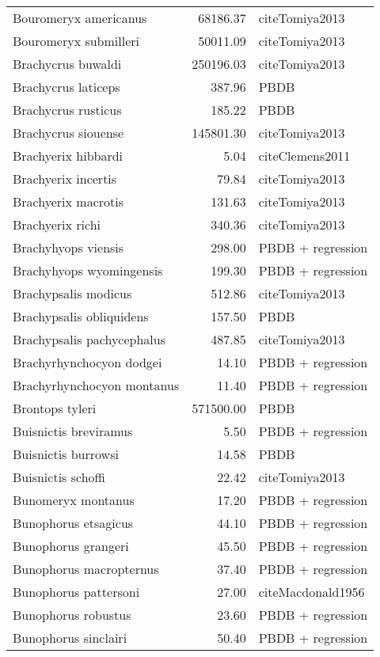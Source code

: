 \begin{table}[ht]
\begin{tabular}{lrl}
  Bouromeryx americanus & 68186.37 & cite{Tomiya2013} \\ 
  Bouromeryx submilleri & 50011.09 & cite{Tomiya2013} \\ 
  Brachycrus buwaldi & 250196.03 & cite{Tomiya2013} \\ 
  Brachycrus laticeps & 387.96 & PBDB \\ 
  Brachycrus rusticus & 185.22 & PBDB \\ 
  Brachycrus siouense & 145801.30 & cite{Tomiya2013} \\ 
  Brachyerix hibbardi & 5.04 & cite{Clemens2011} \\ 
  Brachyerix incertis & 79.84 & cite{Tomiya2013} \\ 
  Brachyerix macrotis & 131.63 & cite{Tomiya2013} \\ 
  Brachyerix richi & 340.36 & cite{Tomiya2013} \\ 
  Brachyhyops viensis & 298.00 & PBDB + regression \\ 
  Brachyhyops wyomingensis & 199.30 & PBDB + regression \\ 
  Brachypsalis modicus & 512.86 & cite{Tomiya2013} \\ 
  Brachypsalis obliquidens & 157.50 & PBDB \\ 
  Brachypsalis pachycephalus & 487.85 & cite{Tomiya2013} \\ 
  Brachyrhynchocyon dodgei & 14.10 & PBDB + regression \\ 
  Brachyrhynchocyon montanus & 11.40 & PBDB + regression \\ 
  Brontops tyleri & 571500.00 & PBDB \\ 
  Buisnictis breviramus & 5.50 & PBDB + regression \\ 
  Buisnictis burrowsi & 14.58 & PBDB \\ 
  Buisnictis schoffi & 22.42 & cite{Tomiya2013} \\ 
  Bunomeryx montanus & 17.20 & PBDB + regression \\ 
  Bunophorus etsagicus & 44.10 & PBDB + regression \\ 
  Bunophorus grangeri & 45.50 & PBDB + regression \\ 
  Bunophorus macropternus & 37.40 & PBDB + regression \\ 
  Bunophorus pattersoni & 27.00 & cite{Macdonald1956} \\ 
  Bunophorus robustus & 23.60 & PBDB + regression \\ 
  Bunophorus sinclairi & 50.40 & PBDB + regression \\ 

\end{tabular}
\end{table}

